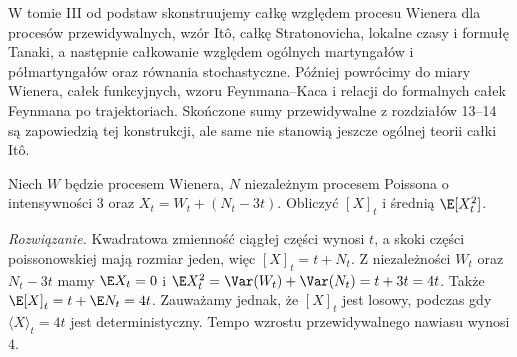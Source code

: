 \begin{uwaga}
W tomie III od podstaw skonstruujemy całkę względem
procesu Wienera dla procesów przewidywalnych, wzór
Itô, całkę Stratonovicha, lokalne czasy i formułę
Tanaki, a następnie całkowanie względem ogólnych
martyngałów i półmartyngałów oraz równania stochastyczne.
Później powrócimy do miary Wienera, całek funkcyjnych,
wzoru Feynmana--Kaca i relacji do formalnych całek
Feynmana po trajektoriach. Skończone sumy przewidywalne
z rozdziałów 13--14 są zapowiedzią tej konstrukcji,
ale same nie stanowią jeszcze ogólnej teorii całki Itô.
\end{uwaga}

\begin{zadanie}
Niech $W$ będzie procesem Wienera, $N$ niezależnym
procesem Poissona o intensywności $3$ oraz
$X_t=W_t+(N_t-3t)$. Obliczyć $[X]_t$ i średnią
$\E[X_t^2]$.

\emph{Rozwiązanie.} Kwadratowa zmienność ciągłej części
wynosi $t$, a skoki części poissonowskiej mają rozmiar
jeden, więc $[X]_t=t+N_t$. Z niezależności
$W_t$ oraz $N_t-3t$ mamy
$\E X_t=0$ i
$\E X_t^2=\Var(W_t)+\Var(N_t)=t+3t=4t$.
Także $\E[X]_t=t+\E N_t=4t$.
Zauważamy jednak, że $[X]_t$ jest losowy, podczas
gdy $\langle X\rangle_t=4t$ jest deterministyczny.
Tempo wzrostu przewidywalnego nawiasu wynosi $4$.
\end{zadanie}

